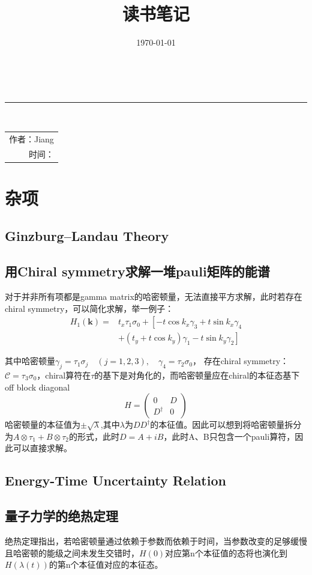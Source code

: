 \documentclass[10pt,openany]{book}
\title{读书笔记}
\date{\today}
\theoremstyle{thmstyle} %
\theoremstyle{defstyle} %
\theoremstyle{prostyle} %
\renewcommand*{\maketitle}{
    \begin{titlepage}
    \newgeometry{margin = 0in}
    \parindent=0pt
    \vfill
    \begin{center}
        \parbox{0.618\textwidth}{
        \hfill {\bfseries \Huge \thetitle} \\[0.6pt]  
        \rule{0.618\textwidth}{4pt} \\ 
    }
    \end{center}
    \vfill
    \begin{center}
        \parbox{0.618\textwidth}{
        \hfill\Large
        \kaishu 
          \begin{tabular}{r|}
          作者：Jiang \\ 
          时间：\thedate \\
        \end{tabular}
        }
    \end{center}
    \vfill
    \begin{center}
        \parbox[t]{0.7\textwidth}{\centering \kaishu }
    \end{center}
    \vfill
\end{titlepage}
\restoregeometry
\thispagestyle{empty}
}
\begin{document}
\frontmatter

\maketitle

\tableofcontents

\mainmatter

\chapter{杂项}
\section{Ginzburg–Landau Theory}
\section{用Chiral symmetry求解一堆pauli矩阵的能谱}
对于并非所有项都是gamma matrix的哈密顿量，无法直接平方求解，此时若存在chiral symmetry，可以简化求解，举一例子：
\begin{equation}
  \begin{aligned}
    H_1(\mathbf{k})= & t_x \tau_1 \sigma_0+\left[-t \cos k_x \gamma_3+t \sin k_x \gamma_4\right. \\
    & \left.+\left(t_y+t \cos k_y\right) \gamma_1-t \sin k_y \gamma_2\right]
    \end{aligned}
\end{equation}

其中哈密顿量$ \gamma_j=\tau_1 \sigma_j \quad(j=1,2,3), \quad \gamma_4=\tau_2 \sigma_0 $， 存在chiral symmetry：$ \mathcal{C}=\tau_3 \sigma_0 $，chiral算符在$ \tau $的基下是对角化的，而哈密顿量应在chiral的本征态基下off block diagonal
\begin{equation*}
  H=\left(\begin{array}{cc}
    0 & D \\
    D^{\dagger} & 0
    \end{array}\right)
\end{equation*}
哈密顿量的本征值为$ \pm \sqrt{\lambda} $,其中$ \lambda $为$ D D^{\dagger} $的本征值。因此可以想到将哈密顿量拆分为$ A\otimes \tau_1 + B\otimes \tau_2 $的形式，此时$ D = A + iB $，此时A、B只包含一个pauli算符，因此可以直接求解。   
\section{Energy-Time Uncertainty Relation}

\section{量子力学的绝热定理}
绝热定理指出，若哈密顿量通过依赖于参数而依赖于时间，当参数改变的足够缓慢且哈密顿的能级之间未发生交错时，$ H(0) $对应第n个本征值的态将也演化到$ H(\lambda(t)) $的第n个本征值对应的本征态。
\end{document}
